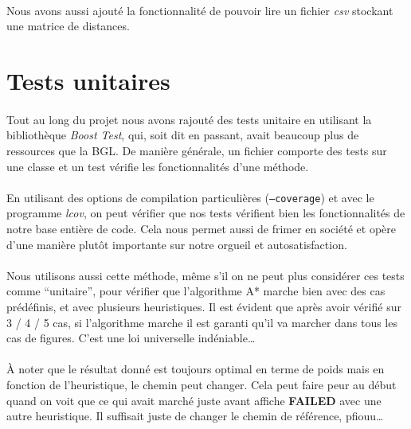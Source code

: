 \documentclass[french]{article}
\begin{document}
\paragraph{} Nous avons aussi ajouté la fonctionnalité de pouvoir lire un
fichier \emph{csv} stockant une matrice de distances.

\section{Tests unitaires}

\paragraph{} Tout au long du projet nous avons rajouté des tests unitaire en
utilisant la bibliothèque \emph{Boost Test}, qui, soit dit en passant, avait
beaucoup plus de ressources que la BGL. De manière générale, un fichier
comporte des tests sur une classe et un test vérifie les fonctionnalités d'une
méthode.

\paragraph{} En utilisant des options de compilation particulières
(\texttt{--coverage}) et avec le programme \emph{lcov}, on peut vérifier que
nos tests vérifient bien les fonctionnalités de notre base entière de code.
Cela nous permet aussi de frimer en société et opère d'une manière plutôt
importante sur notre orgueil et autosatisfaction.

\paragraph{} Nous utilisons aussi cette méthode, même s'il on ne peut plus
considérer ces tests comme ``unitaire'', pour vérifier que l'algorithme A*
marche bien avec des cas prédéfinis, et avec plusieurs heuristiques. Il est
évident que après avoir vérifié sur 3 / 4 / 5 cas, si l'algorithme marche il
est garanti qu'il va marcher dans tous les cas de figures. C'est une loi
universelle indéniable\ldots

\paragraph{} À noter que le résultat donné est toujours optimal en terme de
poids mais en fonction de l'heuristique, le chemin peut changer. Cela peut
faire peur au début quand on voit que ce qui avait marché juste avant affiche
\textbf{FAILED} avec une autre heuristique. Il suffisait juste de changer le
chemin de référence, pfiouu\ldots
\end{document}
